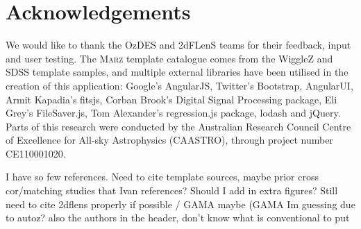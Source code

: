 \documentclass[iop]{emulateapj}
\newcommand{\green}{\color{LimeGreen}}
\newcommand{\marz}{\textsc{Marz}}
\begin{document}
\section*{Acknowledgements}
We would like to thank the OzDES and 2dFLenS teams for their feedback, input and user testing. The \marz{} template catalogue comes from the WiggleZ and SDSS template samples, and multiple external libraries have been utilised in the creation of this application: Google's AngularJS, Twitter's Bootstrap, AngularUI, Armit Kapadia's fitsjs, Corban Brook's Digital Signal Processing package, Eli Grey's FileSaver.js, Tom Alexander's regression.js package, lodash and jQuery. Parts of this research were conducted by the Australian Research Council Centre of Excellence for All-sky Astrophysics (CAASTRO), through project number CE110001020.

{\green I have so few references. Need to cite template sources, maybe prior cross cor/matching studies that Ivan references? Should I add in extra figures? Still need to cite 2dflens properly if possible / GAMA maybe (GAMA Im guessing due to autoz? also the authors in the header, don't know what is conventional to put}


\end{document}
